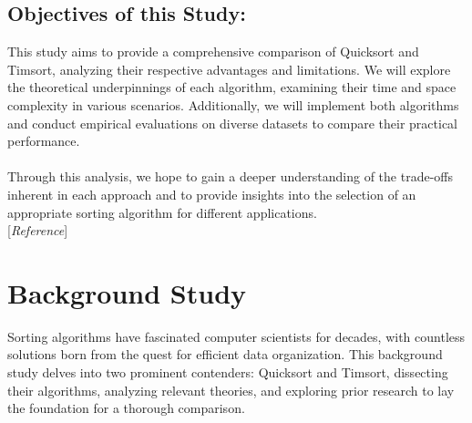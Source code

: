 \documentclass[a4paper, 9pt, twocolumn]{article}
\begin{document}
\subsection{Objectives of this Study:}
This study aims to provide a comprehensive comparison of Quicksort and Timsort, analyzing their respective advantages and limitations. We will explore the theoretical underpinnings of each algorithm, examining their time and space complexity in various scenarios. Additionally, we will implement both algorithms and conduct empirical evaluations on diverse datasets to compare their practical performance.
\\\\
Through this analysis, we hope to gain a deeper understanding of the trade-offs inherent in each approach and to provide insights into the selection of an appropriate sorting algorithm for different applications.
\\
\@[\textit{Reference}\@]\cite{cormen2009}\cite{sedgewick1978}\cite{lafore2002}\cite{StackOverflowTimsort}\cite{WikipediaTimsort}\cite{GeeksforGeeksTimsort}

\section{Background Study}
Sorting algorithms have fascinated computer scientists for decades,
with countless solutions born from the quest for efficient data organization.
This background study delves into two prominent contenders: Quicksort and Timsort,
dissecting their algorithms, analyzing relevant theories, and exploring prior
research to lay the foundation for a thorough comparison.
\end{document}

